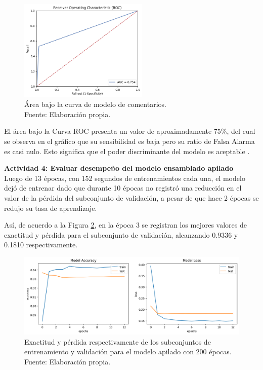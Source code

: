\begin{figure}[!ht]
	\begin{center}
		\includegraphics[width=0.55\textwidth]{5/figures/comments_auc.png}
		\caption[Área bajo la curva de modelo de comentarios]{Área bajo la curva de modelo de comentarios.\\
		Fuente: Elaboración propia.}
		\label{5:fig9}
	\end{center}
\end{figure}

El área bajo la Curva ROC presenta un valor de aproximadamente 75\%, del cual se observa en el gráfico que su sensibilidad es baja pero su ratio de Falsa Alarma es casi nulo. Esto significa que el poder discriminante del modelo es aceptable \parencite{bk_britos2006datamining}.

\textbf{Actividad 4: Evaluar desempeño del modelo ensamblado apilado}
\\
Luego de 13 épocas, con 152 segundos de entrenamientos cada una, el modelo dejó de entrenar dado que durante 10 épocas no registró una reducción en el valor de la pérdida del subconjunto de validación, a pesar de que hace 2 épocas se redujo su tasa de aprendizaje.

Así, de acuerdo a la Figura \ref{5:fig10}, en la época 3 se registran los mejores valores de exactitud y pérdida para el subconjunto de validación, alcanzando 0.9336 y 0.1810 respectivamente.

\begin{figure}[!ht]
	\begin{center}
		\includegraphics[width=1\textwidth]{5/figures/stacked_model_acc_loss.png}
		\caption[Exactitud y pérdida respectivamente de los subconjuntos de entrenamiento y validación para el modelo apilado con 200 épocas]{Exactitud y pérdida respectivamente de los subconjuntos de entrenamiento y validación para el modelo apilado con 200 épocas.\\
		Fuente: Elaboración propia.}
		\label{5:fig10}
	\end{center}
\end{figure}

